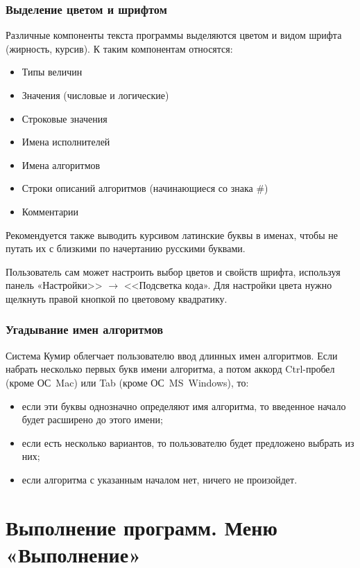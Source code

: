 \subsubsection{Выделение цветом и шрифтом}
\label{highlight}

Различные компоненты текста программы выделяются цветом и видом шрифта (жирность, курсив). К таким компонентам относятся:
\begin{itemize}
\item		Типы величин
\item		Значения (числовые и логические)
\item		Строковые значения
\item		Имена исполнителей
\item		Имена алгоритмов
\item		Строки описаний алгоритмов (начинающиеся со знака \#)
\item		Комментарии
\end{itemize}

Рекомендуется также выводить курсивом латинские буквы в именах, чтобы не путать их с близкими по начертанию русскими буквами.

Пользователь сам может настроить выбор цветов и свойств шрифта, используя панель «Настройки>> $\to$ <<Подсветка кода». Для настройки цвета нужно щелкнуть правой кнопкой по цветовому квадратику.

\subsubsection{Угадывание имен алгоритмов}

Система Кумир облегчает пользователю ввод длинных имен алгоритмов. Если набрать несколько первых букв имени алгоритма, а потом аккорд \textsf{Ctrl-пробел} (кроме ОС~Mac) или \textsf{Tab} (кроме ОС~MS~Windows), то:
\begin{itemize}
\item если эти буквы однозначно определяют имя алгоритма, то введенное начало будет расширено до этого имени;
\item если есть несколько вариантов, то пользователю будет предложено выбрать из них;
\item если алгоритма с указанным началом нет, ничего не произойдет.
\end{itemize}

\section{Выполнение программ. Меню «Выполнение»}
\label{run}

